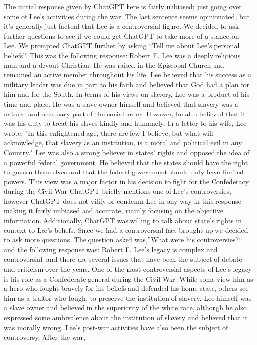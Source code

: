 \documentclass[letterpaper, 10 pt, conference]{ieeeconf}  %
\begin{document}
The initial response given by ChatGPT here is fairly unbiased; just going over some of Lee’s activities during the war. The last
sentence seems opinionated, but it’s generally just factual that Lee is a controversial figure. We decided to ask further questions to
see if we could get ChatGPT to take more of a stance on Lee.
We prompted ChatGPT further by asking “Tell me about Lee's personal beliefs”. This was the following response:
Robert E. Lee was a deeply religious man and a devout Christian. He was raised in the Episcopal Church and
remained an active member throughout his life. Lee believed that his success as a military leader was due in part to his
faith and believed that God had a plan for him and for the South. In terms of his views on slavery, Lee was a product of
his time and place. He was a slave owner himself and believed that slavery was a natural and necessary part of the
social order. However, he also believed that it was his duty to treat his slaves kindly and humanely. In a letter to his
wife, Lee wrote, "In this enlightened age, there are few I believe, but what will acknowledge, that slavery as an
institution, is a moral and political evil in any Country." Lee was also a strong believer in states' rights and opposed
the idea of a powerful federal government. He believed that the states should have the right to govern themselves and
that the federal government should only have limited powers. This view was a major factor in his decision to fight for
the Confederacy during the Civil War
ChatGPT briefly mentions one of Lee’s controversies, however ChatGPT does not vilify or condemn Lee in any way in this
response making it fairly unbiased and accurate, mainly focusing on the objective information. Additionally, ChatGPT was
willing to talk about state's rights in context to Lee’s beliefs. Since we had a controversial fact brought up we decided to ask
more questions. The question asked was,”What were his controversies?“ and the following response was:
Robert E. Lee's legacy is complex and controversial, and there are several issues that have been the subject of debate
and criticism over the years. One of the most controversial aspects of Lee's legacy is his role as a Confederate general
during the Civil War. While some view him as a hero who fought bravely for his beliefs and defended his home state,
others see him as a traitor who fought to preserve the institution of slavery. Lee himself was a slave owner and believed
in the superiority of the white race, although he also expressed some ambivalence about the institution of slavery and
believed that it was morally wrong. Lee's post-war activities have also been the subject of controversy. After the war,
\end{document}
